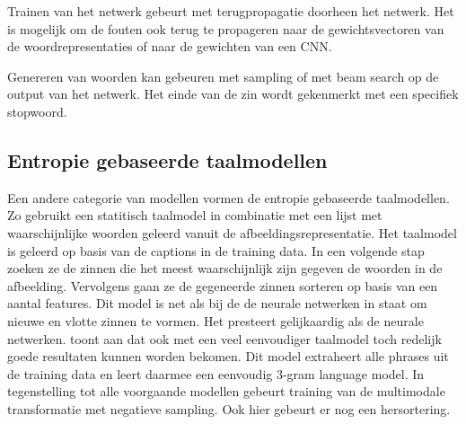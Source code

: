 Trainen van het netwerk gebeurt met terugpropagatie doorheen het netwerk. Het is mogelijk om de fouten ook terug te propageren naar de gewichtsvectoren van de woordrepresentaties of naar de gewichten van een CNN.

Genereren van woorden kan gebeuren met sampling of met beam search op de output van het netwerk. Het einde van de zin wordt gekenmerkt met een specifiek stopwoord.

\subsection{Entropie gebaseerde taalmodellen}
Een andere categorie van modellen vormen de entropie gebaseerde taalmodellen. Zo gebruikt \cite{Fang} een statitisch taalmodel in combinatie met een lijst met waarschijnlijke woorden geleerd vanuit de afbeeldingsrepresentatie. Het taalmodel is geleerd op basis van de captions in de training data. In een volgende stap zoeken ze de zinnen die het meest waarschijnlijk zijn gegeven de woorden in de afbeelding. Vervolgens gaan ze de gegeneerde zinnen sorteren op basis van een aantal features. Dit model is net als bij de de neurale netwerken in staat om nieuwe en vlotte zinnen te vormen. Het presteert gelijkaardig als de neurale netwerken.
\cite{Lebret} toont aan dat ook met een veel eenvoudiger taalmodel toch redelijk goede resultaten kunnen worden bekomen. Dit model extraheert alle phrases uit de training data en leert daarmee een eenvoudig 3-gram language model. In tegenstelling tot alle voorgaande modellen gebeurt training van de multimodale transformatie met negatieve sampling. Ook hier gebeurt er nog een hersortering.

